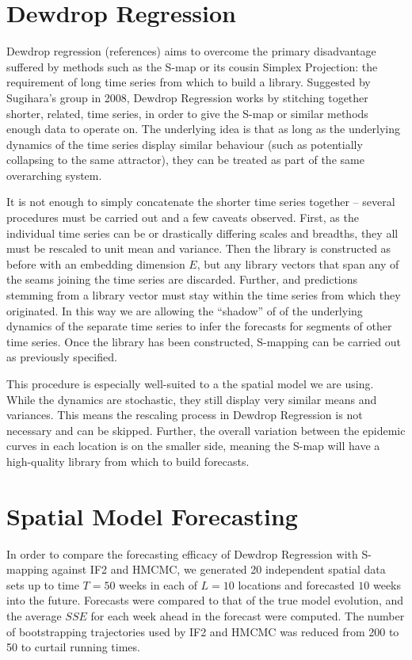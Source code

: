 \section{Dewdrop Regression}

	Dewdrop regression (references) aims to overcome the primary disadvantage suffered by methods such as the S-map or its cousin Simplex Projection: the requirement of long time series from which to build a library. Suggested by Sugihara's group in 2008, Dewdrop Regression works by stitching together shorter, related, time series, in order to give the S-map or similar methods  enough data to operate on. The underlying idea is that as long as the underlying dynamics of the time series display similar behaviour (such as potentially collapsing to the same attractor), they can be treated as part of the same overarching system.

	It is not enough to simply concatenate the shorter time series together -- several procedures must be carried out and a few caveats observed. First, as the individual time series can be or drastically differing scales and breadths, they all must be rescaled to unit mean and variance. Then the library is constructed as before with an embedding dimension $E$, but any library vectors that span any of the seams joining the time series are discarded. Further, and predictions stemming from a library vector must stay within the time series from which they originated. In this way we are allowing the ``shadow'' of of the underlying dynamics of the separate time series to infer the forecasts for segments of other time series. Once the library has been constructed, S-mapping can be carried out as previously specified.

	This procedure is especially well-suited to a the spatial model we are using. While the dynamics are stochastic, they still display very similar means and variances. This means the rescaling process in Dewdrop Regression is not necessary and can be skipped. Further, the overall variation between the epidemic curves in each location is on the smaller side, meaning the S-map will have a high-quality library from which to build forecasts.


\section{Spatial Model Forecasting}

	In order to compare the forecasting efficacy of Dewdrop Regression with S-mapping against IF2 and HMCMC, we generated 20 independent spatial data sets up to time $T = 50$ weeks in each of $L = 10$ locations and forecasted $10$ weeks into the future. Forecasts were compared to that of the true model evolution, and the average $SSE$ for each week ahead in the forecast were computed. The number of bootstrapping trajectories used by IF2 and HMCMC was reduced from 200 to 50 to curtail running times.

